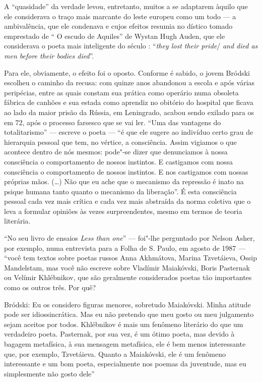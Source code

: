 A ``quasidade'' da verdade levou, entretanto, muitos a se adaptarem
àquilo que ele considerava o traço mais marcante do leste europeu como
um todo --- a ambivalência, que ele condenava e cujos efeitos resumia no
dístico tomado emprestado de `` O escudo de Aquiles'' de Wystan Hugh
Auden, que ele considerava o poeta mais inteligente do século :
``\emph{they lost their pride}/ \emph{and died as men before their
bodies died}''.

Para ele, obviamente, o efeito foi o oposto. Conforme é sabido, o jovem
Bródski escolheu o caminho da recusa: com quinze anos abandonou a escola
e após várias peripécias, entre as quais constam sua prática como
operário numa obsoleta fábrica de canhões e sua estada como aprendiz no
obitório do hospital que ficava ao lado da maior prisão da Rússia, em
Leningrado, acabou sendo exilado para os  em 72, após o processo
farsesco que se vai ler. ``Uma das vantagens do totalitarismo'' ---
escreve o poeta --- ``é que ele sugere ao indivíduo certo grau de
hierarquia pessoal que tem, no vértice, a consciência. Assim vigiamos o
que acontece dentro de nós mesmos: pode"-se dizer que denunciamos à nossa
consciência o comportamento de nossos instintos. E castigamos com nossa
consciência o comportamento de nossos instintos. E nos castigamos com
nossas próprias mãos. (\ldots{}) Não que eu ache que o mecanismo da repressão
é inato na psique humana tanto quanto o mecanismo da liberação''. É esta
consciência pessoal cada vez mais crítica e cada vez mais abstraída da
norma coletiva que o leva a formular opiniões às vezes surpreendentes,
mesmo em termos de teoria literária.

``No seu livro de ensaios \emph{Less than one}'' --- foi"-lhe perguntado
por Nelson Asher, por exemplo, numa entrevista para a Folha de S. Paulo,
em agosto de 1987 --- ``você tem textos sobre poetas russos Anna
Akhmátova, Marina Tzvetáieva, Ossip Mandelstam, mas você não escreve
sobre Vladímir Maiakóvski, Boris Pasternak ou Velímir Khlébnikov, que
são geralmente considerados poetas tão importantes como os outros três.
Por quê?

Bródski: Eu os considero figuras menores, sobretudo Maiakóvski. Minha
atitude pode ser idiossincrática. Mas eu não pretendo que meu gosto ou
meu julgamento sejam aceitos por todos. Khlébnikov é mais um fenômeno
literário do que um verdadeiro poeta. Pasternak, por sua vez, é um ótimo
poeta, mas devido à bagagem metafísica, à sua mensagem metafísica, ele é
bem menos interessante que, por exemplo, Tzvetáieva. Quanto a
Maiakóvski, ele é um fenômeno interessante e um bom poeta, especialmente
nos poemas da juventude, mas eu simplesmente não gosto dele''


